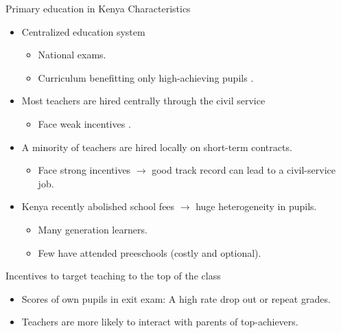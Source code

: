 \documentclass[9pt]{beamer}
\newcommand{\comment}[1]{}  %
\numberwithin{equation}{section}
\begin{document}
\begin{frame}{Primary education in Kenya}
  Characteristics
  \begin{itemize}
    \item Centralized education system
    \begin{itemize}
      \item National exams.
      \item Curriculum benefitting only high-achieving pupils \citep{glewwe2009many}.
    \end{itemize}
    \item Most teachers are hired centrally through the civil service
    \begin{itemize}
      \item Face weak incentives \citep{duflo2011peer}.
    \end{itemize}
    \item A minority of teachers are hired locally on short-term contracts.
    \begin{itemize}
      \item Face strong incentives $\rightarrow$ good track record can lead to a civil-service job.
    \end{itemize}
    \item Kenya recently abolished school fees $\rightarrow$ huge heterogeneity in pupils.
    \begin{itemize}
      \item Many  generation learners.
      \item Few have attended preeschools (costly and optional).
    \end{itemize}
  \end{itemize}
  Incentives to target teaching to the top of the class
  \begin{itemize}
    \item Scores of own pupils in exit exam: A high rate drop out or repeat grades.
    \item Teachers are more likely to interact with parents of top-achievers.
    \comment{As they're more similar}
  \end{itemize}
\end{frame}
\end{document}
